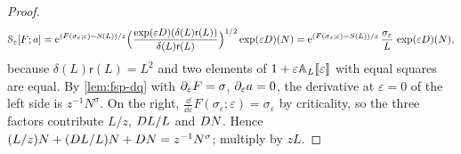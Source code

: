 \begin{proof}
\[
\mathcal S_\varepsilon[F;a]=\mathrm{e}^{(F(\sigma_\varepsilon;\varepsilon)-S(L))/z}\Bigl(\frac{\exp(\varepsilon D)(\delta(L)\mathsf r(L))}{\delta(L)\mathsf r(L)}\Bigr)^{1/2}\exp(\varepsilon D)(N)=\mathrm{e}^{(F(\sigma_\varepsilon;\varepsilon)-S(L))/z}\,\frac{\sigma_\varepsilon}L\,\exp(\varepsilon D)(N),
\]
because $\delta(L)\mathsf r(L)=L^2$ and two elements of $1+\varepsilon\mathbb{A}_{L}[\![ \varepsilon ]\!]$ with equal squares are equal. By \cref{lem:fsp-dq} with $\partial_\varepsilon F=\sigma$, $\partial_\varepsilon a=0$, the derivative at $\varepsilon=0$ of the left side is $z^{-1}N^\sigma$. On the right, $\frac{\dd}{\dd\varepsilon}F(\sigma_\varepsilon;\varepsilon)=\sigma_\varepsilon$ by criticality, so the three factors contribute $L/z$, $D L/L$ and $D N$. Hence $(L/z)N+(D L/L)N+D N=z^{-1}N^\sigma$; multiply by $zL$.
\end{proof}


